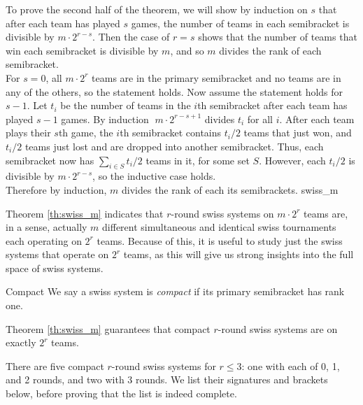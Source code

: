 {{        To prove the second half of the theorem, we will show by induction on $s$ that after each team has played $s$ games, the number of teams in each semibracket is divisible by $m \cdot 2^{r - s}.$ Then the case of $r = s$ shows that the number of teams that win each semibracket is divisible by $m$, and so $m$ divides the rank of each semibracket.\\

        For $s = 0$, all $m \cdot 2^r$ teams are in the primary semibracket and no teams are in any of the others, so the statement holds. Now assume the statement holds for $s - 1$. Let $t_i$ be the number of teams in the $i$th semibracket after each team has played $s -1$ games. By induction $\; m \cdot 2^{r - s + 1}$ divides $t_i$ for all $i$. After each team plays their $s$th game, the $i$th semibracket contains $t_i/2$ teams that just won, and $t_i/2$ teams just lost and are dropped into another semibracket. Thus, each semibracket now has $\sum_{i \in S} t_i / 2$ teams in it, for some set $S.$ However, each $t_i / 2$ is divisible by $m \cdot 2^{r - s}$, so the inductive case holds.\\
        
        Therefore by induction, $m$ divides the rank of each its semibrackets.
    }{swiss_m}

    Theorem \ref{th:swiss_m} indicates that $r$-round swiss systems on $m \cdot 2^r$ teams are, in a sense, actually $m$ different simultaneous and identical swiss tournaments each operating on $2^r$ teams. Because of this, it is useful to study just the swiss systems that operate on $2^r$ teams, as this will give us strong insights into the full space of swiss systems.

    \begin{definition}{Compact}{}
        We say a swiss system is \textit{compact} if its primary semibracket has rank one.
    \end{definition}

    Theorem \ref{th:swiss_m} guarantees that compact $r$-round swiss systems are on exactly $2^r$ teams.


    There are five compact $r$-round swiss systems for $r \leq 3$: one with each of 0, 1, and 2 rounds, and two with 3 rounds. We list their signatures and brackets below, before proving that the list is indeed complete.

}
